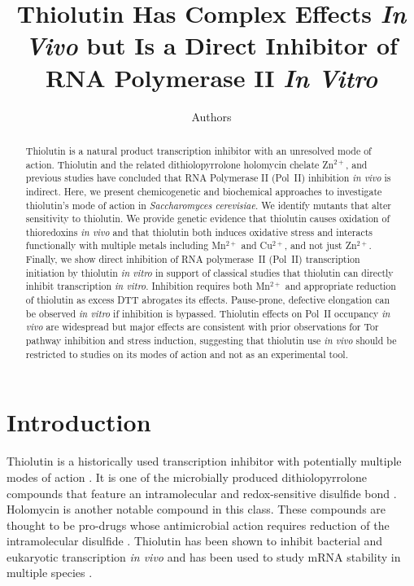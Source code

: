 \documentclass[11pt]{article}
\title{Thiolutin Has Complex Effects \textit{In Vivo} but Is a Direct Inhibitor of RNA Polymerase II \textit{In Vitro}}
\author[1]{Authors}
\affil[1]{Department of Biochemistry, University of Pittsburgh, Pittsburgh, PA, USA}
\date{}
\begin{document}
\maketitle

\begin{abstract}
Thiolutin is a natural product transcription inhibitor with an unresolved mode of action. Thiolutin and the related dithiolopyrrolone holomycin chelate Zn$^{2+}$, and previous studies have concluded that RNA Polymerase II (Pol~II) inhibition \textit{in vivo} is indirect. Here, we present chemicogenetic and biochemical approaches to investigate thiolutin's mode of action in \textit{Saccharomyces cerevisiae}. We identify mutants that alter sensitivity to thiolutin. We provide genetic evidence that thiolutin causes oxidation of thioredoxins \textit{in vivo} and that thiolutin both induces oxidative stress and interacts functionally with multiple metals including Mn$^{2+}$ and Cu$^{2+}$, and not just Zn$^{2+}$. Finally, we show direct inhibition of RNA polymerase~II (Pol~II) transcription initiation by thiolutin \textit{in vitro} in support of classical studies that thiolutin can directly inhibit transcription \textit{in vitro}. Inhibition requires both Mn$^{2+}$ and appropriate reduction of thiolutin as excess DTT abrogates its effects. Pause-prone, defective elongation can be observed \textit{in vitro} if inhibition is bypassed. Thiolutin effects on Pol~II occupancy \textit{in vivo} are widespread but major effects are consistent with prior observations for Tor pathway inhibition and stress induction, suggesting that thiolutin use \textit{in vivo} should be restricted to studies on its modes of action and not as an experimental tool.
\end{abstract}

\section{Introduction}

Thiolutin is a historically used transcription inhibitor with potentially multiple modes of action \citep{jimenez1973,tipper1982}. It is one of the microbially produced dithiolopyrrolone compounds that feature an intramolecular and redox-sensitive disulfide bond \citep{li2014dithiolopyrrolones,li2011holomycin}. Holomycin is another notable compound in this class. These compounds are thought to be pro-drugs whose antimicrobial action requires reduction of the intramolecular disulfide \citep{li2011holomycin}. Thiolutin has been shown to inhibit bacterial and eukaryotic transcription \textit{in vivo} and has been used to study mRNA stability in multiple species \citep{grigull2004,millan2006,parker2003,morey2013}.
\end{document}
